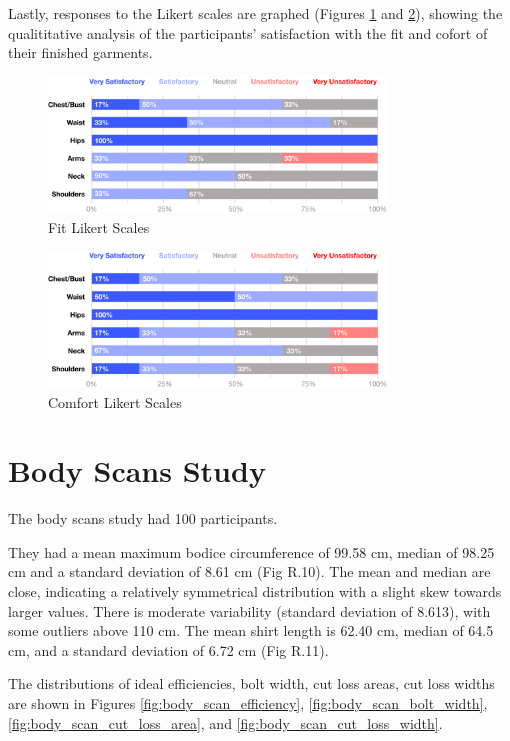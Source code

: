 Lastly, responses to the Likert scales are graphed (Figures \ref{fig:fit_likert} and \ref{fig:comfort_likert}), showing the qualititative analysis of the participants' satisfaction with the fit and cofort of their finished garments.

\begin{figure} [H]
    \centering
    \includegraphics[width = 0.8\textwidth]{Images/fit likert stacked bar.png}
    \caption{Fit Likert Scales}
    \label{fig:fit_likert}
\end{figure}
\begin{figure} [H]
    \centering
    \includegraphics[width = 0.8\textwidth]{Images/comfort likert stacked bar.png}
    \caption{Comfort Likert Scales}
    \label{fig:comfort_likert}
\end{figure}


\section{Body Scans Study}
The body scans study had 100 participants. 

They had a mean maximum bodice circumference of 99.58 cm, median of 98.25 cm and a standard deviation of 8.61 cm (Fig R.10). The mean and median are close, indicating a relatively symmetrical distribution with a slight skew towards larger values. There is moderate variability (standard deviation of 8.613), with some outliers above 110 cm. The mean shirt length is 62.40 cm, median of 64.5 cm, and a standard deviation of 6.72 cm (Fig R.11).

The distributions of ideal efficiencies, bolt width, cut loss areas, cut loss widths are shown in Figures \ref{fig:body_scan_efficiency}, \ref{fig:body_scan_bolt_width}, \ref{fig:body_scan_cut_loss_area}, and \ref{fig:body_scan_cut_loss_width}.

